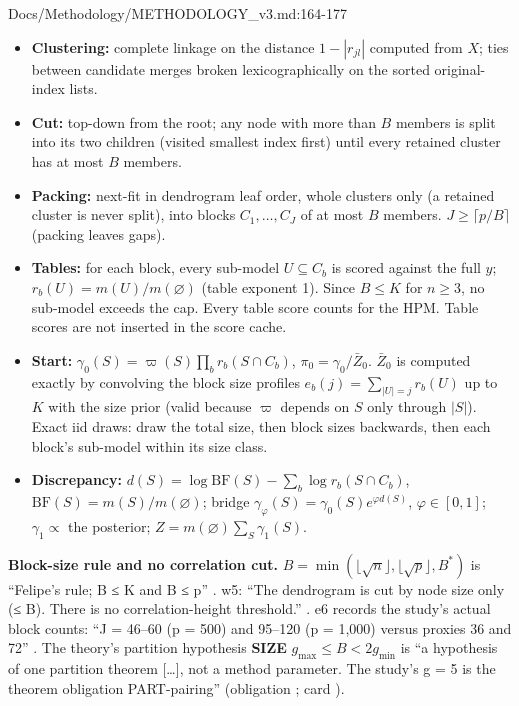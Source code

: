 \begin{stmt}{Docs/Methodology/METHODOLOGY_v3.md:164-177}
\begin{itemize}
\item \textbf{Clustering:} complete linkage on the distance $1-|r_{jl}|$ computed from $X$; ties between candidate merges broken
  lexicographically on the sorted original-index lists.
\item \textbf{Cut:} top-down from the root; any node with more than $B$ members is split into its two children (visited smallest
  index first) until every retained cluster has at most $B$ members.
\item \textbf{Packing:} next-fit in dendrogram leaf order, whole clusters only (a retained cluster is never split), into blocks
  $C_1,\dots,C_J$ of at most $B$ members. $J\ge\lceil p/B\rceil$ (packing leaves gaps).
\item \textbf{Tables:} for each block, every sub-model $U\subseteq C_b$ is scored against the full $y$; $r_b(U)=m(U)/m(\varnothing)$
  (table exponent 1). Since $B\le K$ for $n\ge3$, no sub-model exceeds the cap. Every table score counts for the HPM. Table
  scores are not inserted in the score cache.
\item \textbf{Start:} $\gamma_0(S)=\varpi(S)\prod_b r_b(S\cap C_b)$, $\pi_0=\gamma_0/\bar Z_0$. $\bar Z_0$ is computed exactly by
  convolving the block size profiles $e_b(j)=\sum_{|U|=j}r_b(U)$ up to $K$ with the size prior (valid because $\varpi$ depends on
  $S$ only through $|S|$). Exact iid draws: draw the total size, then block sizes backwards, then each block's sub-model within
  its size class.
\item \textbf{Discrepancy:} $d(S)=\log\mathrm{BF}(S)-\sum_b\log r_b(S\cap C_b)$, $\mathrm{BF}(S)=m(S)/m(\varnothing)$; bridge
  $\gamma_\varphi(S)=\gamma_0(S)e^{\varphi d(S)}$, $\varphi\in[0,1]$; $\gamma_1\propto$ the posterior; $Z=m(\varnothing)\sum_S\gamma_1(S)$.
\end{itemize}
\end{stmt}

\textbf{Block-size rule and no correlation cut.} $B=\min(\lfloor\sqrt n\rfloor,\lfloor\sqrt p\rfloor,B^*)$ is ``Felipe's rule;
B ≤ K and B ≤ p'' . w5: ``The dendrogram is cut by node size
only (≤ B). There is no correlation-height threshold.'' . e6
records the study's actual block counts: ``J = 46–60 (p = 500) and 95–120 (p = 1,000) versus proxies 36 and 72''
. The theory's partition hypothesis \textbf{SIZE}
$g_{\max}\le B<2g_{\min}$ is ``a hypothesis of one partition theorem [\dots], not a method parameter. The study's g = 5 is the
theorem obligation PART-pairing''  (obligation ;
card ).

